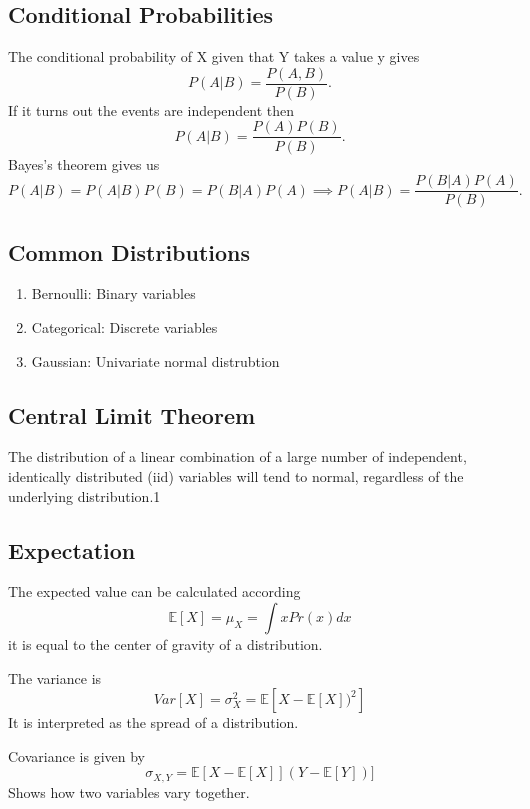\documentclass[12pt]{article}
\numberwithin{equation}{section}
\begin{document}
\subsection{Conditional Probabilities}
The conditional probability of X given that Y takes a value y gives
\begin{equation}
    P(A|B) = \frac{P(A , B)}{P(B)}.
\end{equation}
If it turns out the events are independent then
\begin{equation}
    P(A|B) = \frac{P(A) P(B)}{P(B)}.
\end{equation}
Bayes's theorem gives us
\begin{equation}
    P(A | B) = P(A|B)P(B) = P(B|A)P(A) \implies P(A|B) = \frac{P(B|A) P(A) }{P(B)}.
\end{equation}
\subsection{Common Distributions}
\begin{enumerate}
    \item Bernoulli: Binary variables
    \item Categorical: Discrete variables
    \item Gaussian: Univariate normal distrubtion
\end{enumerate}
\subsection{Central Limit Theorem}
The distribution of a linear combination of a large number of
independent, identically distributed (iid) variables will tend to
normal, regardless of the underlying distribution.1
\subsection{Expectation}
The expected value can be calculated according
\begin{equation}
    \mathbb{E}[X] = \mu_X = \int x Pr(x) dx
\end{equation}
it is equal to the center of gravity of a distribution.

The variance is
\begin{equation}
    Var[X] = \sigma_X^2 = \mathbb{E}[X-\mathbb{E}[X])^2]
\end{equation}
It is interpreted as the spread of a distribution.

Covariance is given by
\begin{equation}
    \sigma_{X,Y} = \mathbb{E}[X-\mathbb{E}[X]](Y-\mathbb{E}[Y])]
\end{equation}
Shows how two variables vary together.
\end{document}
